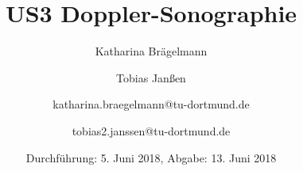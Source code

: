 
\title{US3 Doppler-Sonographie}
\author{Katharina Brägelmann \and Tobias Janßen \and katharina.braegelmann@tu-dortmund.de \and tobias2.janssen@tu-dortmund.de}
\date{Durchführung: 5. Juni 2018, Abgabe: 13. Juni 2018}
\maketitle

\tableofcontents
